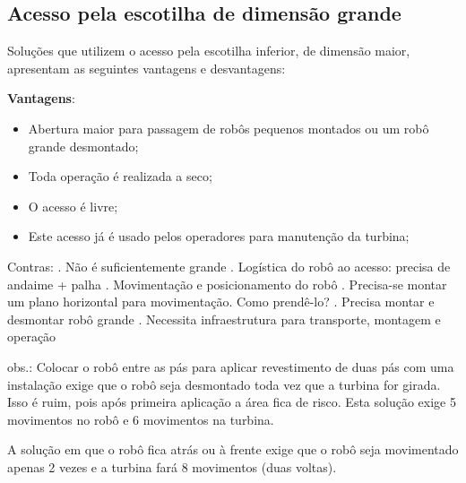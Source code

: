 \subsection{Acesso pela escotilha de dimensão grande}
Soluções que utilizem o acesso pela escotilha inferior, de dimensão maior,
apresentam as seguintes vantagens e desvantagens:

\textbf{Vantagens}:
\begin{itemize}
  \item Abertura maior para passagem de robôs pequenos montados ou um robô
  grande desmontado;
  \item Toda operação é realizada a seco;
  \item O acesso é livre;
  \item Este acesso já é usado pelos operadores para manutenção da turbina;
\end{itemize}

Contras: 
	. Não é suficientemente grande
	. Logística do robô ao acesso: precisa de andaime + palha
	. Movimentação e posicionamento do robô
	. Precisa-se montar um plano horizontal para movimentação. Como prendê-lo?
	. Precisa montar e desmontar robô grande
	. Necessita infraestrutura para transporte, montagem e operação

obs.: Colocar o robô entre as pás para aplicar revestimento de duas pás com uma instalação exige que o robô seja desmontado toda vez que a turbina for girada. Isso é ruim, pois após primeira aplicação a área fica de risco. Esta solução exige 5 movimentos no robô e 6 movimentos na turbina.

A solução em que o robô fica atrás ou à frente exige que o robô seja movimentado apenas 2 vezes e a turbina fará 8 movimentos (duas voltas).



 
